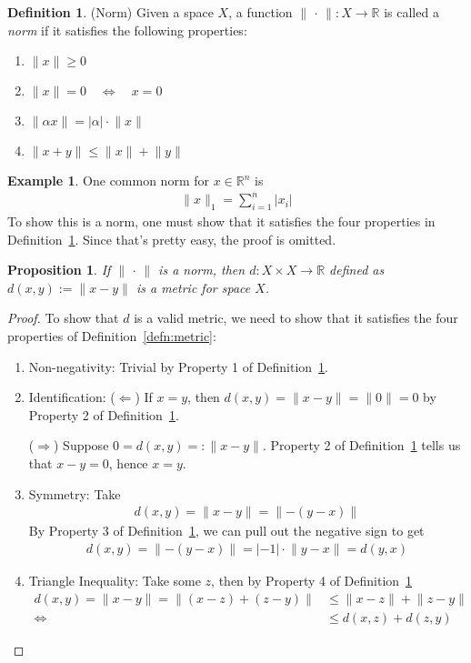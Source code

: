 \documentclass[12pt]{article}
\numberwithin{equation}{section} %
\theoremstyle{plain}
\newtheorem{prop}[thm]{Proposition}
\theoremstyle{definition}
\newtheorem{defn}[thm]{Definition}
\newtheorem{ex}[thm]{Example}
\theoremstyle{remark}
\newcommand{\R}{\mathbb{R}}
\begin{document}
\begin{defn}(Norm)
\label{defn:norm}
Given a space $X$, a function $\lVert\,\cdot\,\rVert:X\rightarrow \R$ is
called a \emph{norm} if it satisfies the following properties:
\begin{enumerate}
  \item $\lVert x\rVert\geq 0$
  \item $\lVert x\rVert=0 \quad \iff \quad x=0$
  \item $\lVert \alpha x\rVert= |\alpha| \cdot \lVert x\rVert$
  \item $\lVert x+y\rVert \leq \lVert x\rVert + \lVert y\rVert$
\end{enumerate}
\end{defn}

\begin{ex}
One common norm for $x\in \R^n$ is
\begin{align*}
  \lVert x\rVert_1 = \sum^n_{i=1} |x_i|
\end{align*}
To show this is a norm, one must show that it satisfies the four
properties in Definition~\ref{defn:norm}. Since that's pretty easy, the
proof is omitted.
\end{ex}

\begin{prop}
If $\lVert \,\cdot\,\rVert$ is a norm, then $d:X \times X\rightarrow \R$
defined as $d(x,y):=\lVert x-y\rVert$ is a metric for space $X$.
\end{prop}
\begin{proof}
To show that $d$ is a valid metric, we need to show that it satisfies
the four properties of Definition~\ref{defn:metric}:
\begin{enumerate}
  \item Non-negativity: Trivial by Property 1 of
    Definition~\ref{defn:norm}.
  \item Identification: ($\Leftarrow$) If $x=y$, then
    $d(x,y)=\lVert x-y\rVert=\lVert 0\rVert=0$ by Property 2 of
    Definition~\ref{defn:norm}.

    ($\Rightarrow$) Suppose $0 = d(x,y) =: \lVert x-y\rVert$. Property 2
    of Definition~\ref{defn:norm} tells us that $x-y=0$, hence $x=y$.
  \item Symmetry: Take
    \begin{align*}
      d(x,y)= \lVert x-y\rVert= \lVert -(y-x)\rVert
    \end{align*}
    By Property 3 of
    Definition~\ref{defn:norm}, we can pull out the negative sign to get
    \begin{align*}
      d(x,y)= \lVert -(y-x)\rVert =|-1| \cdot \lVert y-x\rVert = d(y,x)
    \end{align*}
  \item Triangle Inequality: Take some $z$, then by Property 4 of
    Definition~\ref{defn:norm}
    \begin{align*}
      d(x,y) = \lVert x-y\rVert
      = \lVert (x-z)+ (z-y) \rVert
      &\leq \lVert x-z\rVert +\lVert z-y\rVert
      \\
      \Leftrightarrow\qquad
      &\leq d(x,z) + d(z,y)
    \end{align*}
\end{enumerate}
\end{proof}
\end{document}
